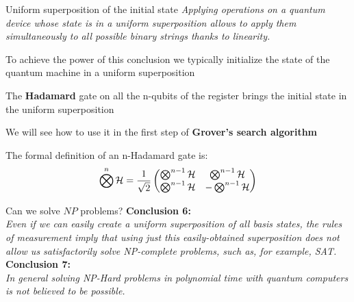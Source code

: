 		\begin{frame}{Uniform superposition of the initial state}
			\small
			\emph{Applying operations on a quantum device whose state is in a uniform superposition allows to apply them simultaneously to all possible binary strings thanks to linearity.}
			
			\vspace{0.3cm}
			
			To achieve the power of this conclusion we typically initialize the state of the quantum machine in a uniform superposition\\
			
			\vspace{0.2cm}
			
			The \textbf{Hadamard} gate on all the n-qubits of the register brings the initial state in the uniform superposition\\
			
			\vspace{0.2cm}
			
			We will see how to use it in the first step of \textbf{Grover's search algorithm}\\
			
			\vspace{0.2cm}
			
			The formal definition of an n-Hadamard gate is:
			\begin{equation*}
				\centering
				\bigotimes^{n}\mathcal{H} = \frac{1}{\sqrt{2}}
				\begin{pmatrix}
					\bigotimes^{n-1}\mathcal{H} & \bigotimes^{n-1}\mathcal{H} \\
					\bigotimes^{n-1}\mathcal{H} & -\bigotimes^{n-1}\mathcal{H}
				\end{pmatrix}
			\end{equation*}
		\end{frame}
	
		\begin{frame}{Can we solve $NP$ problems?}
			\small
			\textbf{Conclusion 6:\\}
			\emph{Even if we can easily create a uniform superposition of all basis states, the rules of measurement imply that using just this easily-obtained superposition does not allow us satisfactorily solve NP-complete problems, such as, for example, SAT.\\}
			\vspace{0.2cm}
			\textbf{Conclusion 7:\\}
			\emph{In general solving NP-Hard problems in polynomial time with quantum computers is not believed to be possible.}
			\vspace{0.3cm}
		\end{frame}
		
